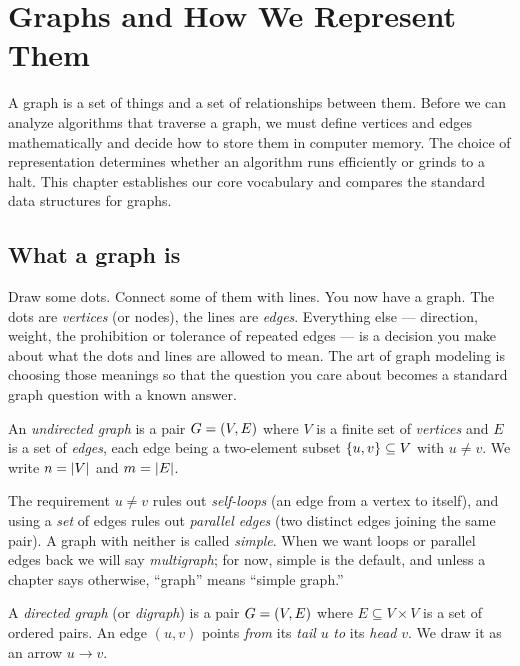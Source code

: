 \chapter{Graphs and How We Represent Them}

A graph is a set of things and a set of relationships between them. Before we can analyze algorithms that traverse a graph, we must define vertices and edges mathematically and decide how to store them in computer memory. The choice of representation determines whether an algorithm runs efficiently or grinds to a halt. This chapter establishes our core vocabulary and compares the standard data structures for graphs.

\chapterline

\section{What a graph is}
\label{ch01:formal}

\begin{intuitionbox}
Draw some dots. Connect some of them with lines. You now have a graph. The dots
are \emph{vertices} (or nodes), the lines are \emph{edges}. Everything else ---
direction, weight, the prohibition or tolerance of repeated edges --- is a
decision you make about what the dots and lines are allowed to mean. The art of
graph modeling is choosing those meanings so that the question you care about
becomes a standard graph question with a known answer.
\end{intuitionbox}

\begin{definition}
\label{ch01:def-undirected}
An \emph{undirected graph} is a pair $G = (V, E)$ where $V$ is a finite set
of \emph{vertices} and $E$ is a set of \emph{edges}, each edge being a
two-element subset $\{u,v\} \subseteq V$ with $u \neq v$. We write
$n = \lvert V\rvert$ and $m = \lvert E\rvert$.
\end{definition}

The requirement $u \neq v$ rules out \emph{self-loops} (an edge from a vertex to
itself), and using a \emph{set} of edges rules out \emph{parallel edges} (two
distinct edges joining the same pair). A graph with neither is called
\emph{simple}. When we want loops or parallel edges back we will say
\emph{multigraph}; for now, simple is the default, and unless a chapter says
otherwise, ``graph'' means ``simple graph.''

\begin{definition}
\label{ch01:def-directed}
A \emph{directed graph} (or \emph{digraph}) is a pair $G = (V, E)$ where
$E \subseteq V \times V$ is a set of ordered pairs. An edge $(u,v)$ points
\emph{from} its \emph{tail} $u$ \emph{to} its \emph{head} $v$. We draw it as an
arrow $u \to v$.
\end{definition}

